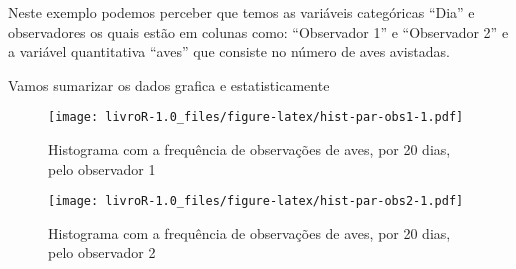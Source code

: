 \documentclass[titlepage, oneside, openany, a4paper]{book}
\newenvironment{Shaded}{\begin{snugshade}}{\end{snugshade}}
\newcommand{\DataTypeTok}[1]{\textcolor[rgb]{0.13,0.29,0.53}{#1}}
\newcommand{\DecValTok}[1]{\textcolor[rgb]{0.00,0.00,0.81}{#1}}
\newcommand{\KeywordTok}[1]{\textcolor[rgb]{0.13,0.29,0.53}{\textbf{#1}}}
\newcommand{\NormalTok}[1]{#1}
\newcommand{\OperatorTok}[1]{\textcolor[rgb]{0.81,0.36,0.00}{\textbf{#1}}}
\newcommand{\StringTok}[1]{\textcolor[rgb]{0.31,0.60,0.02}{#1}}
\begin{document}
Neste exemplo podemos perceber que temos as variáveis categóricas ``Dia'' e observadores os quais estão em colunas como: ``Observador 1'' e ``Observador 2'' e a variável quantitativa ``aves'' que consiste no número de aves avistadas.

Vamos sumarizar os dados grafica e estatisticamente

\begin{Shaded}
\end{Shaded}

\begin{figure}
\centering
\texttt{[image: livroR-1.0\_files/figure-latex/hist-par-obs1-1.pdf]}
\caption{\label{fig:hist-par-obs1}Histograma com a frequência de observações de aves, por 20 dias, pelo observador 1}
\end{figure}

\begin{Shaded}
\end{Shaded}

\begin{figure}
\centering
\texttt{[image: livroR-1.0\_files/figure-latex/hist-par-obs2-1.pdf]}
\caption{\label{fig:hist-par-obs2}Histograma com a frequência de observações de aves, por 20 dias, pelo observador 2}
\end{figure}

\begin{Shaded}
\end{Shaded}
\end{document}
